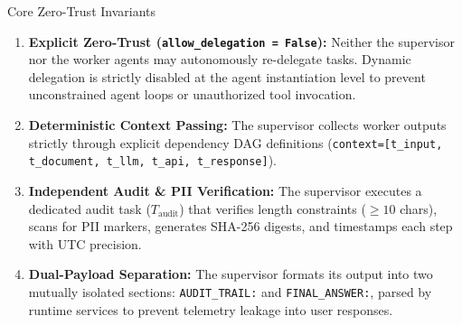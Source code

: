 \documentclass[10pt,a4paper]{article}
\begin{document}
\begin{calloutbox}{Core Zero-Trust Invariants}
\begin{enumerate}
    \item \textbf{Explicit Zero-Trust (\texttt{allow\_delegation = False}):} Neither the supervisor nor the worker agents may autonomously re-delegate tasks. Dynamic delegation is strictly disabled at the agent instantiation level to prevent unconstrained agent loops or unauthorized tool invocation.
    \item \textbf{Deterministic Context Passing:} The supervisor collects worker outputs strictly through explicit dependency DAG definitions (\texttt{context=[t\_input, t\_document, t\_llm, t\_api, t\_response]}).
    \item \textbf{Independent Audit \& PII Verification:} The supervisor executes a dedicated audit task ($T_{\text{audit}}$) that verifies length constraints ($\ge 10$ chars), scans for PII markers, generates SHA-256 digests, and timestamps each step with UTC precision.
    \item \textbf{Dual-Payload Separation:} The supervisor formats its output into two mutually isolated sections: \texttt{AUDIT\_TRAIL:} and \texttt{FINAL\_ANSWER:}, parsed by runtime services to prevent telemetry leakage into user responses.
\end{enumerate}
\end{calloutbox}
\end{document}
